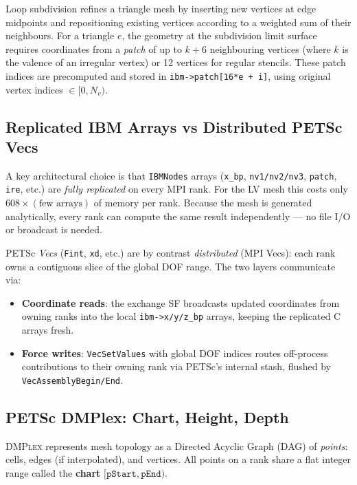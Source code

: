 \documentclass[11pt]{article}
\begin{document}
Loop subdivision refines a triangle mesh by inserting new vertices at edge midpoints
and repositioning existing vertices according to a weighted sum of their neighbours.
For a triangle $e$, the geometry at the subdivision limit surface requires coordinates
from a \emph{patch} of up to $k+6$ neighbouring vertices (where $k$ is the valence
of an irregular vertex) or 12 vertices for regular stencils.
These patch indices are precomputed and stored in \texttt{ibm->patch[16*e + i]},
using original vertex indices $\in [0, N_v)$.

\subsection{Replicated IBM Arrays vs Distributed PETSc Vecs}

A key architectural choice is that \texttt{IBMNodes} arrays (\texttt{x\_bp},
\texttt{nv1/nv2/nv3}, \texttt{patch}, \texttt{ire}, etc.) are \emph{fully replicated}
on every MPI rank.  For the LV mesh this costs only $608 \times (\text{few arrays})$
of memory per rank.  Because the mesh is generated analytically, every rank can
compute the same result independently --- no file I/O or broadcast is needed.

PETSc \emph{Vecs} (\texttt{Fint}, \texttt{xd}, etc.) are by contrast
\emph{distributed} (MPI Vecs): each rank owns a contiguous slice of the global DOF
range.  The two layers communicate via:
\begin{itemize}
  \item \textbf{Coordinate reads}: the exchange SF broadcasts updated coordinates from
        owning ranks into the local \texttt{ibm->x/y/z\_bp} arrays, keeping the
        replicated C arrays fresh.
  \item \textbf{Force writes}: \texttt{VecSetValues} with global DOF indices routes
        off-process contributions to their owning rank via PETSc's internal stash,
        flushed by \texttt{VecAssemblyBegin/End}.
\end{itemize}

\subsection{PETSc DMPlex: Chart, Height, Depth}

\textsc{DMPlex} represents mesh topology as a Directed Acyclic Graph (DAG) of
\emph{points}: cells, edges (if interpolated), and vertices.  All points on a rank
share a flat integer range called the \textbf{chart} $[\texttt{pStart}, \texttt{pEnd})$.
\end{document}
